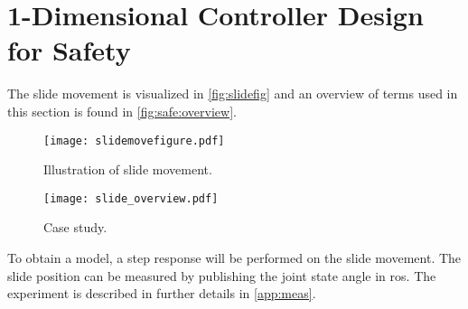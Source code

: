 \section{1-Dimensional Controller Design for Safety}
The slide movement is visualized in \autoref{fig:slidefig} and an overview of terms used in this section is found in \autoref{fig:safe:overview}.
\begin{figure}[!htb]
    \centering
    \begin{minipage}{.5\textwidth}
        \centering
        \texttt{[image: slidemovefigure.pdf]}
        \caption{Illustration of slide movement.}
        \label{fig:slidefig}
    \end{minipage}%
    \begin{minipage}{0.5\textwidth}
        \centering
        \texttt{[image: slide\_overview.pdf]}
        \caption{Case study.}
        \label{fig:safe:overview}
    \end{minipage}
\end{figure}

To obtain a model, a step response will be performed on the slide movement. The slide position can be measured by publishing the joint state angle in \gls{ros}. The experiment is described in further details in \autoref{app:meas}.

